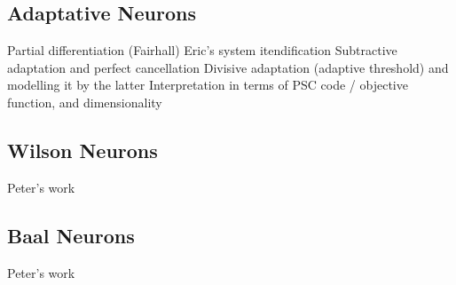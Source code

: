\subsection{Adaptative Neurons}
\label{sec:adaptive-neurons}

Partial differentiation (Fairhall)
Eric's system itendification
Subtractive adaptation and perfect cancellation
Divisive adaptation (adaptive threshold) and modelling it by the latter
Interpretation in terms of PSC code / objective function, and dimensionality

\subsection{Wilson Neurons}

Peter's work

\subsection{Baal Neurons}

Peter's work
